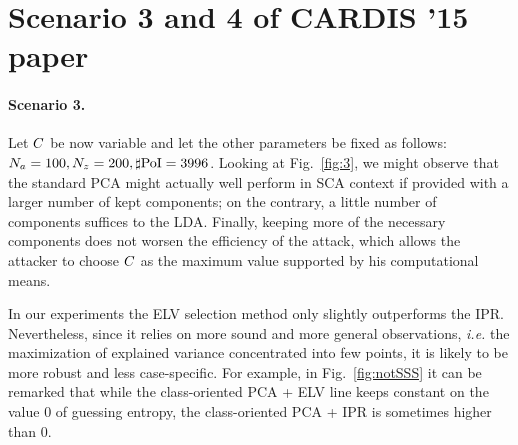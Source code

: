 \chapter*{Scenario 3 and 4 of CARDIS '15 paper}\label{Appendix_scenario3_4_cardis2015}

\subsubsection{Scenario 3.}
Let  $C$ be now variable and let the other parameters be fixed as follows: $N_a = 100, N_z=200, \sharp\mathrm{PoI} = 3996$. Looking at Fig.~\ref{fig:3}, we might observe that the standard PCA might actually well perform in SCA context if provided with a larger number of kept components; on the contrary, a little number of components suffices to the LDA. Finally, keeping more of the necessary components does not worsen the efficiency of the attack, which allows the attacker to choose $C$ as the maximum value supported by his computational means.

\begin{remark}
In our experiments the ELV selection method only slightly outperforms the IPR. Nevertheless, since it relies on more sound and more general observations, {\em i.e.} the maximization of explained variance concentrated into few points, it is likely to be more robust and less case-specific. For example, in Fig.~\ref{fig:notSSS} it can be remarked that while the class-oriented PCA + ELV line keeps constant on the value 0 of guessing entropy, the class-oriented PCA + IPR is sometimes higher than 0.
\end{remark}

